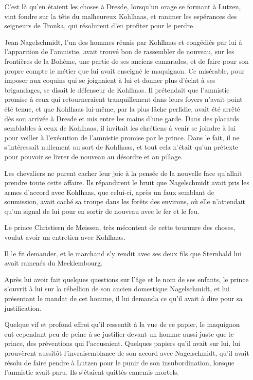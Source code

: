 \documentclass[french,twoside]{book} %
\newcommand\chaptercont{} %
\begin{document}
\chaptercont
\noindent C’est là qu’en étaient les choses à Dresde, lorsqu’un orage se formant à Lutzen, vint fondre sur la tête du malheureux Kohlhaas, et ranimer les espérances des seigneurs de Tronka, qui résolurent d’en profiter pour le perdre.\par
Jean Nagelschmidt, l’un des hommes réunis par Kohlhaas et congédiés par lui à l’apparition de l’amnistie, avait trouvé bon de rassembler de nouveau, sur les frontières de la Bohème, une partie de ses anciens camarades, et de faire pour son propre compte le métier que lui avait enseigné le maquignon. Ce misérable, pour imposer aux coquins qui se joignaient à lui et donner plus d’éclat à ses brigandages, se disait le défenseur de Kohlhaas. Il prétendait que l’amnistie promise à ceux qui retourneraient tranquillement dans leurs foyers n’avait point été tenue, et que Kohlhaas lui-même, par la plus lâche perfidie, avait été arrêté dès son arrivée à Dresde et mis entre les mains d’une garde. Dans des placards semblables à ceux de Kohlhaas, il invitait les chrétiens à venir se joindre à lui pour veiller à l’exécution de l’amnistie promise par le prince. Dans le fait, il ne s’intéressait nullement au sort de Kohlhaas, et tout cela n’était qu’un prétexte pour pouvoir se livrer de nouveau au désordre et au pillage.\par
Les chevaliers ne purent cacher leur joie à la pensée de la nouvelle face qu’allait prendre toute cette affaire. Ils répandirent le bruit que Nagelschmidt avait pris les armes d’accord avec Kohlhaas, que celui-ci, après un faux semblant de soumission, avait caché sa troupe dans les forêts des environs, où elle n’attendait qu’un signal de lui pour en sortir de nouveau avec le fer et le feu.\par
Le prince Christiern de Meissen, très mécontent de cette tournure des choses, voulut avoir un entretien avec Kohlhaas.\par
Il le fit demander, et le marchand s’y rendit avec ses deux fils que Sternbald lui avait ramenés du Mecklembourg.\par
Après lui avoir fait quelques questions sur l’âge et le nom de ses enfants, le prince s’ouvrit à lui sur la rébellion de son ancien domestique Nagelschmidt, et lui présentant le mandat de cet homme, il lui demanda ce qu’il avait à dire pour sa justification.\par
Quelque vif et profond effroi qu’il ressentît à la vue de ce papier, le maquignon eut cependant peu de peine à se justifier devant un homme aussi juste que le prince, des préventions qui l’accusaient. Quelques papiers qu’il avait sur lui, lui prouvèrent aussitôt l’invraisemblance de son accord avec Nagelschmidt, qu’il avait résolu de faire pendre à Lutzen pour le punir de son insubordination, lorsque l’amnistie avait paru. Ils s’étaient quittés ennemis mortels.\par
\end{document}
